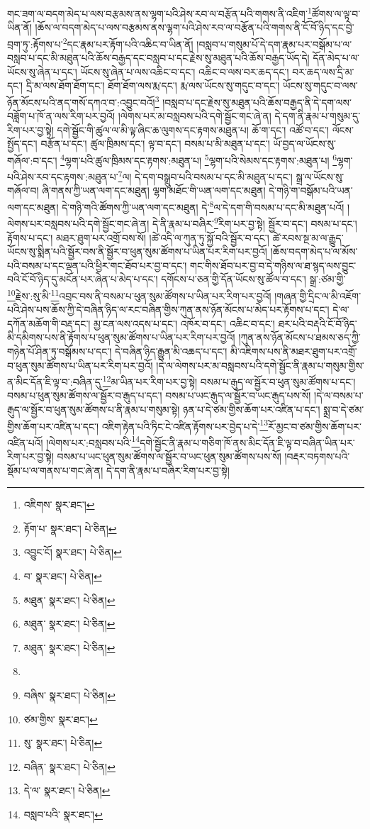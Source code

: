 གང་ཟག་ལ་བདག་མེད་པ་ལས་བརྩམས་ནས་ལྷག་པའི་ཤེས་རབ་ལ་བརྩོན་པའི་གགས་ནི་འཇིག་\footnote{འཇིགས་  སྣར་ཐང་། }ཚོགས་ལ་ལྟ་བ་ཡིན་ནོ། །ཆོས་ལ་བདག་མེད་པ་ལས་བརྩམས་ནས་ལྷག་པའི་ཤེས་རབ་ལ་བརྩོན་པའི་གགས་ནི་ངོ་བོ་ཉིད་དང་བྱེ་བྲག་ཏུ་:རྟོགས་པ་\footnote{རྟོག་པ་  སྣར་ཐང་།  པེ་ཅིན། }དང་རྣམ་པར་རྟོག་པའི་འཆིང་བ་ཡིན་ནོ། །བསླབ་པ་གསུམ་པོ་དེ་དག་རྣམ་པར་བསྒོམ་པ་ལ་བསླབ་པ་དང་མི་མཐུན་པའི་ཆོས་བརྒྱད་དང་བསླབ་པ་དང་རྗེས་སུ་མཐུན་པའི་ཆོས་བརྒྱད་ཡོད་དེ། དོན་མེད་པ་ལ་ཡོངས་སུ་ཞེན་པ་དང་། ཡོངས་སུ་ཞེན་པ་ལས་འཆིང་བ་དང་། འཆིང་བ་ལས་བར་ཆད་དང་། བར་ཆད་ལས་དྲི་མ་དང་། དྲི་མ་ལས་ཐོག་ཐོག་དང་། ཐོག་ཐོག་ལས་རྨ་དང་། རྨ་ལས་ཡོངས་སུ་གདུང་བ་དང་། ཡོངས་སུ་གདུང་བ་ལས་ཉོན་མོངས་པའི་ནད་གསོ་དཀའ་བ་:འབྱུང་བའོ།\footnote{འབྱུང་ངོ།  སྣར་ཐང་།  པེ་ཅིན། } །བསླབ་པ་དང་རྗེས་སུ་མཐུན་པའི་ཆོས་བརྒྱད་ནི་དེ་དག་ལས་བཟློག་པ་ཁོ་ན་ལས་རིག་པར་བྱའོ། །ལེགས་པར་མ་བསླབས་པའི་དགེ་སྦྱོང་གང་ཞེ་ན། དེ་དག་ནི་རྣམ་པ་གསུམ་དུ་རིག་པར་བྱ་སྟེ། དགེ་སྦྱོང་གི་ཚུལ་ལ་མི་ལྟ་ཞིང་ཆ་ལུགས་དང་རྟགས་མཐུན་པ། ཆོ་ག་དང་། འཚོ་བ་དང་། ལོངས་སྤྱོད་དང་། བརྩོན་པ་དང་། ཚུལ་ཁྲིམས་དང་། ལྟ་བ་དང་། བསམ་པ་མི་མཐུན་པ་དང་། ཡོ་བྱད་ལ་ཡོངས་སུ་གཞོལ་:བ་དང་། \footnote{བ་  སྣར་ཐང་།  པེ་ཅིན། }ལྷག་པའི་ཚུལ་ཁྲིམས་དང་རྟགས་:མཐུན་པ། \footnote{མཐུན་  སྣར་ཐང་།  པེ་ཅིན། }ལྷག་པའི་སེམས་དང་རྟགས་:མཐུན་པ། \footnote{མཐུན་  སྣར་ཐང་།  པེ་ཅིན། }ལྷག་པའི་ཤེས་རབ་དང་རྟགས་:མཐུན་པ་\footnote{མཐུན་  སྣར་ཐང་།  པེ་ཅིན། }ལ། དེ་དག་བསྒྲུབ་པའི་བསམ་པ་དང་མི་མཐུན་པ་དང་། སྒྲ་ལ་ཡོངས་སུ་གཞོལ་བ། ཞི་གནས་ཀྱི་ཡན་ལག་དང་མཐུན། ལྷག་མཐོང་གི་ཡན་ལག་དང་མཐུན། དེ་གཉི་ག་བསྒོམ་པའི་ཡན་ལག་དང་མཐུན། དེ་གཉི་གའི་ཚོགས་ཀྱི་ཡན་ལག་དང་མཐུན། དེ་\footnote{}ལ་དེ་དག་གི་བསམ་པ་དང་མི་མཐུན་པའོ། །ལེགས་པར་བསླབས་པའི་དགེ་སྦྱོང་གང་ཞེ་ན། དེ་ནི་རྣམ་པ་བཞིར་\footnote{བཞིས་  སྣར་ཐང་།  པེ་ཅིན། }རིག་པར་བྱ་སྟེ། སྦྱོར་བ་དང་། བསམ་པ་དང་། རྟོགས་པ་དང་། མཐར་ཐུག་པར་འགྲོ་བས་སོ། །ཚེ་འདི་ལ་ཀུན་ཏུ་སྐྱོ་བའི་སྦྱོར་བ་དང་། ཚེ་རབས་སྔ་མ་ལ་རྒྱུད་ཡོངས་སུ་སྨིན་པའི་སྦྱོར་བས་ནི་སྦྱོར་བ་ཕུན་སུམ་ཚོགས་པ་ཡིན་པར་རིག་པར་བྱའོ། །ཆོས་བདག་མེད་པ་ལ་མོས་པའི་བསམ་པ་དང་ལྡན་པའི་ཕྱིར་གང་ཐོབ་པར་བྱ་བ་དང་། གང་གིས་ཐོབ་པར་བྱ་བ་དེ་གཉིས་ལ་ཐ་སྙད་ལས་བྱུང་བའི་ངོ་བོ་ཉིད་དུ་མངོན་པར་ཞེན་པ་མེད་པ་དང་། དགོངས་པ་ཅན་གྱི་དོན་ཡོངས་སུ་ཚོལ་བ་དང་། སྒྲ་:ཙམ་གྱི་\footnote{ཙམ་གྱིས་  སྣར་ཐང་། }རྗེས་:སུ་མི་\footnote{སུ་  སྣར་ཐང་།  པེ་ཅིན། }འབྲང་བས་ནི་བསམ་པ་ཕུན་སུམ་ཚོགས་པ་ཡིན་པར་རིག་པར་བྱའོ། །གཞན་གྱི་དྲིང་ལ་མི་འཇོག་པའི་ཤེས་པས་ཆོས་ཀྱི་དེ་བཞིན་ཉིད་ལ་རང་བཞིན་གྱིས་ཀུན་ནས་ཉོན་མོངས་པ་མེད་པར་རྟོགས་པ་དང་། དེ་ལ་དཀོན་མཆོག་གི་བརྡ་དང་། མྱ་ངན་ལས་འདས་པ་དང་། འཁོར་བ་དང་། འཆིང་བ་དང་། ཐར་པའི་བརྡའི་ངོ་བོ་ཉིད་མི་དམིགས་པས་ནི་རྟོགས་པ་ཕུན་སུམ་ཚོགས་པ་ཡིན་པར་རིག་པར་བྱའོ། །ཀུན་ནས་ཉོན་མོངས་པ་ཐམས་ཅད་ཀྱི་གཉེན་པོ་ཤིན་ཏུ་བསྒོམས་པ་དང་། དེ་བཞིན་ཉིད་རྒྱུན་མི་འཆད་པ་དང་། མི་འཇིགས་པས་ནི་མཐར་ཐུག་པར་འགྲོ་བ་ཕུན་སུམ་ཚོགས་པ་ཡིན་པར་རིག་པར་བྱའོ། །དེ་ལ་ལེགས་པར་མ་བསླབས་པའི་དགེ་སྦྱོང་ནི་རྣམ་པ་གསུམ་གྱིས་ན་མིང་དོན་ཇི་ལྟ་བ་:བཞིན་དུ་\footnote{བཞིན་  སྣར་ཐང་།  པེ་ཅིན། }མ་ཡིན་པར་རིག་པར་བྱ་སྟེ། བསམ་པ་རྒུད་ལ་སྦྱོར་བ་ཕུན་སུམ་ཚོགས་པ་དང་། བསམ་པ་ཕུན་སུམ་ཚོགས་ལ་སྦྱོར་བ་རྒུད་པ་དང་། བསམ་པ་ཡང་རྒུད་ལ་སྦྱོར་བ་ཡང་རྒུད་པས་སོ། །དེ་ལ་བསམ་པ་རྒུད་ལ་སྦྱོར་བ་ཕུན་སུམ་ཚོགས་པ་ནི་རྣམ་པ་གསུམ་སྟེ། ཉན་པ་དེ་ཙམ་གྱིས་ཆོག་པར་འཛིན་པ་དང་། སྨྲ་བ་དེ་ཙམ་གྱིས་ཆོག་པར་འཛིན་པ་དང་། འཇིག་རྟེན་པའི་ཏིང་ངེ་འཛིན་རྟོགས་པར་བྱེད་པ་དེ་\footnote{དེ་ལ་  སྣར་ཐང་།  པེ་ཅིན། }རོ་མྱང་བ་ཙམ་གྱིས་ཆོག་པར་འཛིན་པའོ། །ལེགས་པར་:བསླབས་པའི་\footnote{བསླབ་པའི་  སྣར་ཐང་། }དགེ་སྦྱོང་ནི་རྣམ་པ་གཅིག་ཁོ་ནས་མིང་དོན་ཇི་ལྟ་བ་བཞིན་ཡིན་པར་རིག་པར་བྱ་སྟེ། བསམ་པ་ཡང་ཕུན་སུམ་ཚོགས་ལ་སྦྱོར་བ་ཡང་ཕུན་སུམ་ཚོགས་པས་སོ། །བརྡར་བཏགས་པའི་སྡོམ་པ་ལ་གནས་པ་གང་ཞེ་ན། དེ་དག་ནི་རྣམ་པ་བཞིར་རིག་པར་བྱ་སྟེ། 